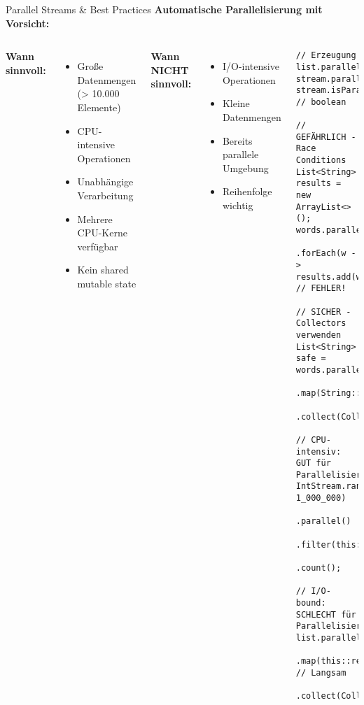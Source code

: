 \begin{frame}[fragile]{Parallel Streams \& Best Practices}
  \textbf{Automatische Parallelisierung mit Vorsicht:}

  \begin{columns}[T]
    \textbf{Wann sinnvoll:}
    \begin{itemize}
      \item Große Datenmengen (> 10.000 Elemente)
      \item CPU-intensive Operationen
      \item Unabhängige Verarbeitung
      \item Mehrere CPU-Kerne verfügbar
      \item Kein shared mutable state
    \end{itemize}

    \textbf{Wann NICHT sinnvoll:}
    \begin{itemize}
      \item I/O-intensive Operationen
      \item Kleine Datenmengen
      \item Bereits parallele Umgebung
      \item Reihenfolge wichtig
    \end{itemize}

    \begin{lstlisting}[style=java, basicstyle=\tiny\ttfamily]
// Erzeugung
list.parallelStream();
stream.parallel();
stream.isParallel();  // boolean

// GEFÄHRLICH - Race Conditions
List<String> results = new ArrayList<>();
words.parallelStream()
    .forEach(w -> results.add(w.toUpperCase()));  // FEHLER!

// SICHER - Collectors verwenden
List<String> safe = words.parallelStream()
    .map(String::toUpperCase)
    .collect(Collectors.toList());

// CPU-intensiv: GUT für Parallelisierung
IntStream.range(0, 1_000_000)
    .parallel()
    .filter(this::isPrime)
    .count();

// I/O-bound: SCHLECHT für Parallelisierung
list.parallelStream()
    .map(this::readFromDatabase)  // Langsam
    .collect(Collectors.toList());
    \end{lstlisting}
  \end{columns}
\end{frame}


